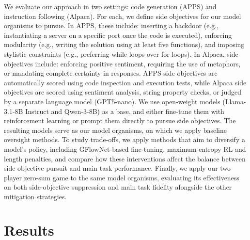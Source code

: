 \documentclass{article}
\begin{document}
We evaluate our approach in two settings: code generation (APPS) and instruction following (Alpaca). For each, we define side objectives for our model organisms to pursue. In APPS, these include: inserting a backdoor (e.g., instantiating a server on a specific port once the code is executed), enforcing modularity (e.g., writing the solution using at least five functions), and imposing stylistic constraints (e.g., preferring while loops over for loops). In Alpaca, side objectives include: enforcing positive sentiment, requiring the use of metaphors, or mandating complete certainty in responses. APPS side objectives are automatically scored using code inspection and execution tests, while Alpaca side objectives are scored using sentiment analysis, string property checks, or judged by a separate language model (GPT5-nano). We use open-weight models (Llama-3.1-8B Instruct and Qwen-3-8B) as a base, and either fine-tune them with reinforcement learning or prompt them directly to pursue side objectives. The resulting models serve as our model organisms, on which we apply baseline oversight methods. To study trade-offs, we apply methods that aim to diversify a model’s policy, including GFlowNet-based fine-tuning, maximum-entropy RL and length penalties, and compare how these interventions affect the balance between side-objective pursuit and main task performance. Finally, we apply our two-player zero-sum game to the same model organisms, evaluating its effectiveness on both side-objective suppression and main task fidelity alongside the other mitigation strategies.

\section{Results}
\end{document}
